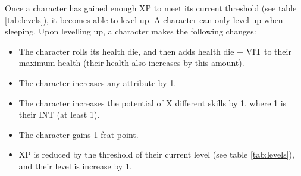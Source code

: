 \begin{multicols}{2}
    Once a character has gained enough XP to meet its current threshold (see table
    \ref{tab:levels}), it becomes able to level up. A character can only level
    up when sleeping. Upon levelling up, a character makes the following changes:
    \begin{itemize}
        \item The character rolls its health die, and then adds health die +
            VIT to their maximum health (their health also increases by this
            amount).
        \item The character increases any attribute by 1.
        \item The character increases the potential of X different skills by 1,
            where 1 is their INT (at least 1).
        \item The character gains 1 feat point.
        \item XP is reduced by the threshold of their current level (see table
            \ref{tab:levels}), and their level is increase by 1.
    \end{itemize}
\end{multicols}
